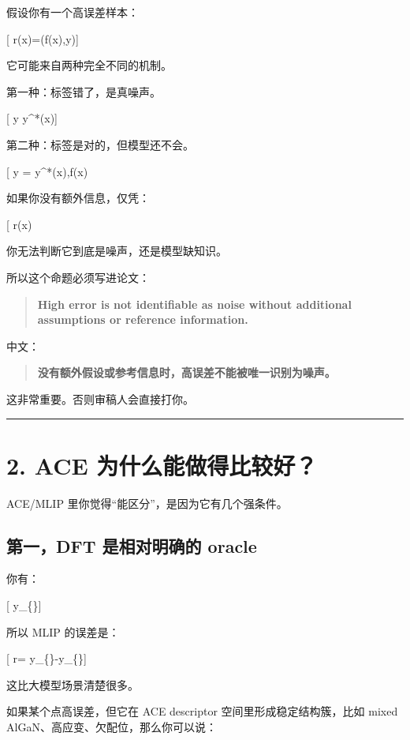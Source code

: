 \documentclass[
  12pt,
]{ctexart}
\begin{document}
假设你有一个高误差样本：

{[} r(x)=\ell(f(x),y){]}

它可能来自两种完全不同的机制。

第一种：标签错了，是真噪声。

{[} y \neq y\^{}*(x){]}

第二种：标签是对的，但模型还不会。

{[} y = y\^{}*(x),\quad f(x)~\text{wrong}{]}

如果你没有额外信息，仅凭：

{[} r(x)~\text{很大}{]}

你无法判断它到底是噪声，还是模型缺知识。

所以这个命题必须写进论文：

\begin{quote}
\textbf{High error is not identifiable as noise without additional
assumptions or reference information.}
\end{quote}

中文：

\begin{quote}
\textbf{没有额外假设或参考信息时，高误差不能被唯一识别为噪声。}
\end{quote}

这非常重要。否则审稿人会直接打你。

\begin{center}\rule{0.5\linewidth}{0.5pt}\end{center}

\section{2. ACE
为什么能做得比较好？}\label{ace-ux4e3aux4ec0ux4e48ux80fdux505aux5f97ux6bd4ux8f83ux597d}

ACE/MLIP 里你觉得``能区分''，是因为它有几个强条件。

\subsection{第一，DFT 是相对明确的
oracle}\label{ux7b2cux4e00dft-ux662fux76f8ux5bf9ux660eux786eux7684-oracle}

你有：

{[} y\_\{\}{]}

所以 MLIP 的误差是：

{[} r= y\_\{\}-y\_\{\}{]}

这比大模型场景清楚很多。

如果某个点高误差，但它在 ACE descriptor 空间里形成稳定结构簇，比如 mixed
AlGaN、高应变、欠配位，那么你可以说：
\end{document}
